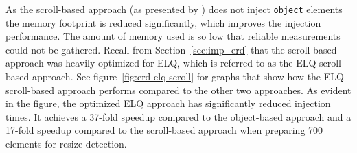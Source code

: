 \documentclass{acm_proc_article-sp}
\newcommand{\code}[1]{\texttt{#1}}
\newcommand{\elq}{ELQ}
\begin{document}
    As the scroll-based approach (as presented by \cite{backalley}) does not inject \code{object} elements the memory footprint is reduced significantly, which improves the injection performance.
    The amount of memory used is so low that reliable measurements could not be gathered.
    Recall from Section~\ref{sec:imp_erd} that the scroll-based approach was heavily optimized for \elq{}, which is referred to as the \elq{} scroll-based approach.
    See figure~\ref{fig:erd-elq-scroll} for graphs that show how the \elq{} scroll-based approach performs compared to the other two approaches.
    As evident in the figure, the optimized \elq{} approach has significantly reduced injection times.
    It achieves a 37-fold speedup compared to the object-based approach and a 17-fold speedup compared to the scroll-based approach when preparing 700 elements for resize detection.

    


\end{document}
